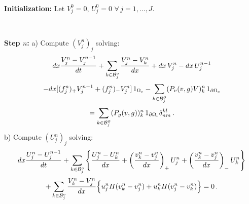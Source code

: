 \documentclass[11pt]{article}
\def \hueco{\noalign{\medskip}}
\def \beq{\begin{equation}}
\def \eeq{\end{equation}}
\def \ba{\begin{array}}
\def \ea{\end{array}}
\def \dis{\displaystyle}
\numberwithin{theorem}{section}
\begin{document}
\

\textbf{Initialization:}
Let $V_j^0=0$,  $U_j^0=0$ $\forall\, j=1,\dots,J.$


\

\textbf{Step $n$:} 
 a) Compute $(V_j^n)_j$ solving:
%
\beq\label{eq:scheme_Vg}
\ba{c}\dis
dx\frac{V_j^n-V_j^{n-1}}{dt}
   +\sum_{k\in {\cal B}_j^o }\frac{V_{j}^n-V_k^{n}}{dx}
   + dx \,V_j^n    - dx \, U_j^{n-1} 
\\ \hueco\dis
    - dx[(f^n_j)_+V^{n-1}_j+(f_j^n)_-V^n_j]\, 1_{\Omega_c}
     - \sum_{k\in {\cal B}_j^\partial }(P_v(v,g) V)^n_k \, 1_{\partial\Omega_c}
\\ \hueco\dis
    =  \sum_{k\in {\cal B}_j^\partial }
     (P_g(v,g) )_k^n \, 1_{\partial\Omega_c} \delta_{nm}^{kl}\,.
\ea
\eeq
b) Compute $(U_j^n)_j$ solving:
\beq\label{eq:scheme_Ug}
\ba{c}\dis
dx\frac{U_j^n-U_j^{n-1}}{dt}
+\sum_{k\in {\cal B}_j^o }\left\{\frac{U_{j}^n-U_k^{n}}{dx}
+\left(\frac{v_{k}^n-v_j^{n}}{dx}\right)_+U_j^n  +\left(\frac{v_{k}^n-v_j^{n}}{dx}\right)_-U_{k}^n \right\}
\\ \hueco\dis
+\sum_{k\in {\cal B}_j^o }\frac{V_{k}^n-V_j^{n}}{dx} \Big\{
u_j^n  H(v_{k}^n-v_j^{n}) 
+u_{k}^n H(v_{j}^n-v_k^{n}) \Big\}
=0\,.
\ea
\eeq
\end{document}
